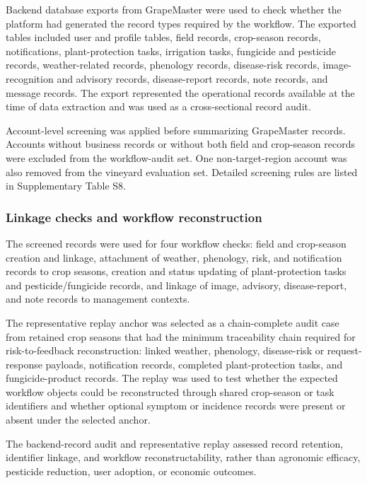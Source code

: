 \documentclass[12pt]{article}
\begin{document}
Backend database exports from GrapeMaster were used to check whether the platform had generated the record types required by the workflow. The exported tables included user and profile tables, field records, crop-season records, notifications, plant-protection tasks, irrigation tasks, fungicide and pesticide records, weather-related records, phenology records, disease-risk records, image-recognition and advisory records, disease-report records, note records, and message records. The export represented the operational records available at the time of data extraction and was used as a cross-sectional record audit.

Account-level screening was applied before summarizing GrapeMaster records. Accounts without business records or without both field and crop-season records were excluded from the workflow-audit set. One non-target-region account was also removed from the vineyard evaluation set. Detailed screening rules are listed in Supplementary Table S8.

\subsubsection{Linkage checks and workflow reconstruction}\label{linkage-checks-and-workflow-reconstruction}

The screened records were used for four workflow checks: field and crop-season creation and linkage, attachment of weather, phenology, risk, and notification records to crop seasons, creation and status updating of plant-protection tasks and pesticide/fungicide records, and linkage of image, advisory, disease-report, and note records to management contexts.

The representative replay anchor was selected as a chain-complete audit case from retained crop seasons that had the minimum traceability chain required for risk-to-feedback reconstruction: linked weather, phenology, disease-risk or request-response payloads, notification records, completed plant-protection tasks, and fungicide-product records. The replay was used to test whether the expected workflow objects could be reconstructed through shared crop-season or task identifiers and whether optional symptom or incidence records were present or absent under the selected anchor.

The backend-record audit and representative replay assessed record retention, identifier linkage, and workflow reconstructability, rather than agronomic efficacy, pesticide reduction, user adoption, or economic outcomes.
\end{document}
